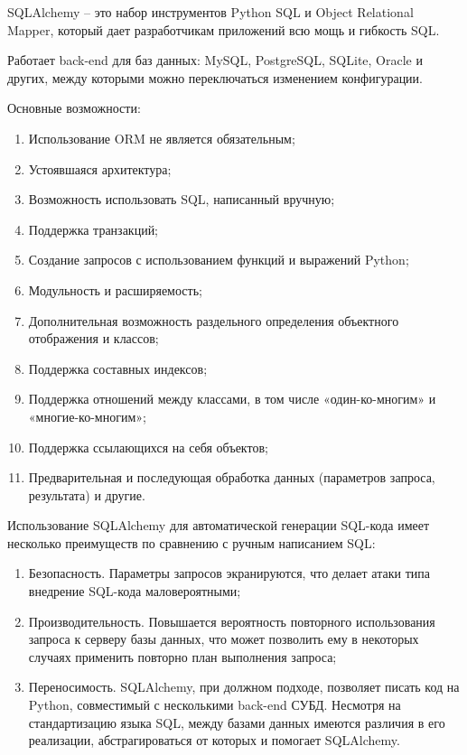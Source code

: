\documentclass{altsu-report}
\begin{document}
\begin{enumerate}
    SQLAlchemy -- это набор инструментов Python SQL и Object Relational Mapper, который дает разработчикам приложений всю мощь и гибкость SQL.
    
    Работает back-end для баз данных: MySQL, PostgreSQL, SQLite, Oracle и других, между которыми можно переключаться изменением конфигурации.
    
    Основные возможности:
    
    \begin{enumerate}
        \item Использование ORM не является обязательным;    
        \item Устоявшаяся архитектура;
        \item Возможность использовать SQL, написанный вручную;    
        \item Поддержка транзакций;
        \item Создание запросов с использованием функций и выражений Python;
        \item Модульность и расширяемость;
        \item Дополнительная возможность раздельного определения объектного отображения и классов;
        \item Поддержка составных индексов;
        \item Поддержка отношений между классами, в том числе «один-ко-многим» и «многие-ко-многим»;
        \item Поддержка ссылающихся на себя объектов;
        \item Предварительная и последующая обработка данных (параметров запроса, результата) и другие.
    \end{enumerate}
    
    Использование SQLAlchemy для автоматической генерации SQL-кода имеет несколько преимуществ по сравнению с ручным написанием SQL:
    
    \begin{enumerate}
        \item Безопасность. Параметры запросов экранируются, что делает атаки типа внедрение SQL-кода маловероятными;
        \item Производительность. Повышается вероятность повторного использования запроса к серверу базы данных, что может позволить ему в некоторых случаях применить повторно план выполнения запроса;
        \item Переносимость. SQLAlchemy, при должном подходе, позволяет писать код на Python, совместимый с несколькими back-end СУБД. Несмотря на стандартизацию языка SQL, между базами данных имеются различия в его реализации, абстрагироваться от которых и помогает SQLAlchemy.
    \end{enumerate}
\end{enumerate}
\end{document}
